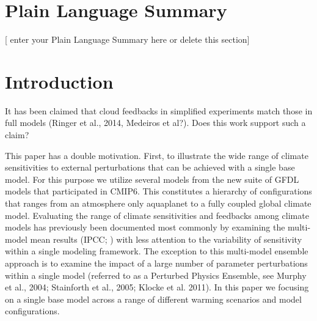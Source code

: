 \documentclass[draft]{agujournal2019}
\begin{document}
\section*{Plain Language Summary}
[ enter your Plain Language Summary here or delete this section]


\section{Introduction}


It has been claimed that cloud feedbacks in simplified experiments match those in full models (Ringer et al., 2014, Medeiros et al?).  
Does this work support such a claim? 

This paper has a double motivation.  First, to illustrate the wide range of climate sensitivities to external perturbations 
that can be achieved with a single base model.  For this purpose we utilize several models from the new suite of GFDL 
models that participated in CMIP6.  This constitutes a hierarchy of configurations that ranges from an atmosphere only 
aquaplanet to a fully coupled global
climate model.  Evaluating the range of climate sensitivities and feedbacks among climate models 
has previously been documented most commonly by examining the multi-model mean results (IPCC; ) with less attention to 
the variability of sensitivity within a single modeling framework.  
The exception to this multi-model ensemble approach is to examine the impact of a large number of parameter perturbations
within a single model (referred to as a Perturbed Physics Ensemble, see Murphy et al., 2004; Stainforth et al., 2005; Klocke et al. 2011).  
In this paper we focusing on a single base model across a range of different warming scenarios and model configurations. 
\end{document}

